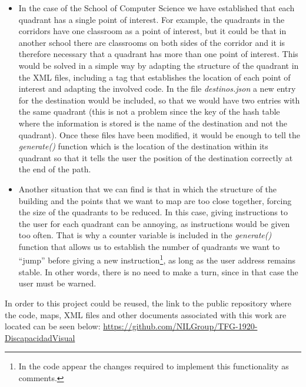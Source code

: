 \begin{itemize}
		
	\item In the case of the School of Computer Science we have established that each quadrant has a single point of interest. For example, the quadrants in the corridors have one classroom as a point of interest, but it could be that in another school there are classrooms on both sides of the corridor and it is therefore necessary that a quadrant has more than one point of interest. This would be solved in a simple way by adapting the structure of the quadrant in the XML files, including a tag that establishes the location of each point of interest and adapting the involved code. In the file \textit{destinos.json} a new entry for the destination would be included, so that we would have two entries with the same quadrant (this is not a problem since the key of the hash table where the information is stored is the name of the destination and not the quadrant). Once these files have been modified, it would be enough to tell the \textit{generate()} function which is the location of the destination within its quadrant so that it tells the user the position of the destination correctly at the end of the path.
		
	\item Another situation that we can find is that in which the structure of the building and the points that we want to map are too close together, forcing the size of the quadrants to be reduced. In this case, giving instructions to the user for each quadrant can be annoying, as instructions would be given too often. That is why a counter variable is included in the \textit{generate()} function that allows us to establish the number of quadrants we want to ``jump'' before giving a new instruction\footnote{In the code appear the changes required to implement this functionality as comments.}, as long as the user address remains stable. In other words, there is no need to make a turn, since in that case the user must be warned.  
		
\end{itemize}
	
In order to this project could be reused, the link to the public repository where the code, maps, XML files and other documents associated with this work are located can be seen below: \url{https://github.com/NILGroup/TFG-1920-DiscapacidadVisual}
	



